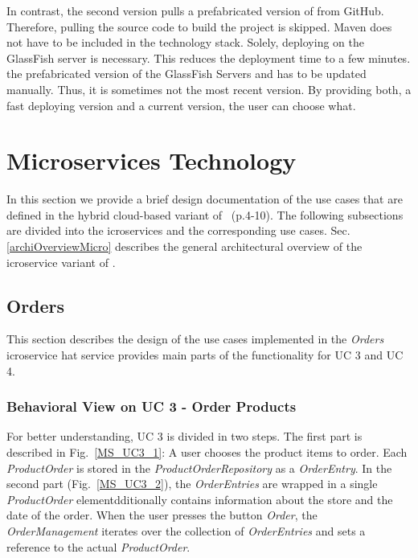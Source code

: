 In contrast, the second version pulls a prefabricated version of \CoCoME from GitHub. 
Therefore, pulling the source code to build the \CoCoME project is skipped. 
Maven does not have to be included in the technology stack. 
Solely, deploying \CoCoME on the GlassFish server is necessary.
This reduces the deployment time to a few minutes.
 the prefabricated version of the GlassFish Servers and \CoCoME has to be updated manually. 
Thus, it is sometimes not the most recent version.
By providing both, a fast deploying version and a current version, the user can choose what.
	

	

	
\section{Microservices Technology} \label{MS}
In this section we provide a brief design documentation of the use cases that are defined in the hybrid cloud-based variant of \CoCoME~\cite{herold2008}(p.4-10).
The following subsections are divided into the icroservices and the corresponding use cases. 
Sec.\ref{archiOverviewMicro} describes the general architectural overview of the icroservice variant of \CoCoME.
	



	\FloatBarrier
		\subsection{Orders}
		This section describes the design of the use cases implemented in the \textit{Orders} icroservice
		hat service provides main parts of the functionality for UC 3 and UC 4.

		\subsubsection*{Behavioral View on UC 3 - Order Products} 
		For  better understanding, UC 3 is divided in two steps. The first part is described in Fig.~\ref{MS_UC3_1}: A user chooses the product items to order. Each \textit{ProductOrder} is stored in the \textit{ProductOrderRepository} as a \textit{OrderEntry}. In the second part (Fig.~\ref{MS_UC3_2}), the \textit{OrderEntries} are wrapped in a single \textit{ProductOrder} elementdditionally contains information about the store and the date of the order. When the user presses the button \textit{Order}, the \textit{OrderManagement} iterates over the collection of \textit{OrderEntries} and sets a reference to the actual \textit{ProductOrder}.
	

